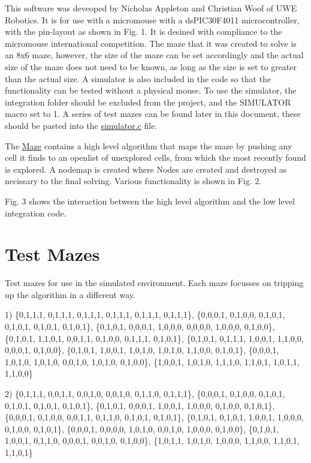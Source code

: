 This software was deveoped by Nicholas Appleton and Christian Woof of U\+WE Robotics. It is for use with a micromouse with a ds\+P\+I\+C30\+F4011 microcontroller, with the pin-\/layout as shown in Fig. 1. It is desined with compliance to the micromouse international competition. The maze that it was created to solve is an 8x6 maze, however, the size of the maze can be set accordingly and the actual size of the maze does not need to be known, as long as the size is set to greater than the actual size. A simulator is also included in the code so that the functionality can be tested without a physical mouse. To use the simulator, the integration folder should be excluded from the project, and the S\+I\+M\+U\+L\+A\+T\+OR macro set to 1. A series of test mazes can be found later in this document, these should be pasted into the \hyperlink{simulator_8c}{simulator.\+c} file.



The \hyperlink{structMaze}{Maze} contains a high level algorithm that maps the maze by pushing any cell it finds to an openlist of unexplored cells, from which the most recently found is explored. A nodemap is created where Nodes are created and destroyed as necissary to the final solving. Various functionality is shown in Fig. 2.



Fig. 3 shows the interaction between the high level algorithm and the low level integration code.



\section*{Test Mazes}

Test mazes for use in the simulated environment. Each maze focusses on tripping up the algorithm in a different way.

1) \{0,1,1,1, 0,1,1,1, 0,1,1,1, 0,1,1,1, 0,1,1,1, 0,1,1,1\}, \{0,0,0,1, 0,1,0,0, 0,1,0,1, 0,1,0,1, 0,1,0,1, 0,1,0,1\}, \{0,1,0,1, 0,0,0,1, 1,0,0,0, 0,0,0,0, 1,0,0,0, 0,1,0,0\}, \{0,1,0,1, 1,1,0,1, 0,0,1,1, 0,1,0,0, 0,1,1,1, 0,1,0,1\}, \{0,1,0,1, 0,1,1,1, 1,0,0,1, 1,1,0,0, 0,0,0,1, 0,1,0,0\}, \{0,1,0,1, 1,0,0,1, 1,0,1,0, 1,0,1,0, 1,1,0,0, 0,1,0,1\}, \{0,0,0,1, 1,0,1,0, 1,0,1,0, 0,0,1,0, 1,0,1,0, 0,1,0,0\}, \{1,0,0,1, 1,0,1,0, 1,1,1,0, 1,1,0,1, 1,0,1,1, 1,1,0,0\}

2) \{0,1,1,1, 0,0,1,1, 0,0,1,0, 0,0,1,0, 0,1,1,0, 0,1,1,1\}, \{0,0,0,1, 0,1,0,0, 0,1,0,1, 0,1,0,1, 0,1,0,1, 0,1,0,1\}, \{0,1,0,1, 0,0,0,1, 1,0,0,1, 1,0,0,0, 0,1,0,0, 0,1,0,1\}, \{0,0,0,1, 0,1,0,0, 0,0,1,1, 0,1,1,0, 0,1,0,1, 0,1,0,1\}, \{0,1,0,1, 0,1,0,1, 1,0,0,1, 1,0,0,0, 0,1,0,0, 0,1,0,1\}, \{0,0,0,1, 0,0,0,0, 1,0,1,0, 0,0,1,0, 1,0,0,0, 0,1,0,0\}, \{0,1,0,1, 1,0,0,1, 0,1,1,0, 0,0,0,1, 0,0,1,0, 0,1,0,0\}, \{1,0,1,1, 1,0,1,0, 1,0,0,0, 1,1,0,0, 1,1,0,1, 1,1,0,1\}

